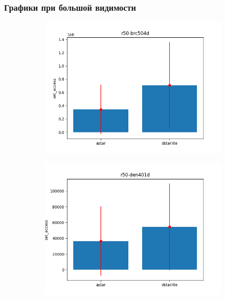 \documentclass{beamer}
\begin{document}
    \begin{frame}
        \frametitle{Графики при большой видимости}
        \begin{figure}
            \centering
            \begin{subfigure}[b]{0.49\textwidth}
                \centering
                \includegraphics[width=\textwidth]{../figures/astar-to-dstarlite/r50-brc504d}
            \end{subfigure}
            \hfill
            \begin{subfigure}[b]{0.49\textwidth}
                \centering
                \includegraphics[width=\textwidth]{../figures/astar-to-dstarlite/r50-den401d}
            \end{subfigure}

\end{figure}
\end{frame}
\end{document}
